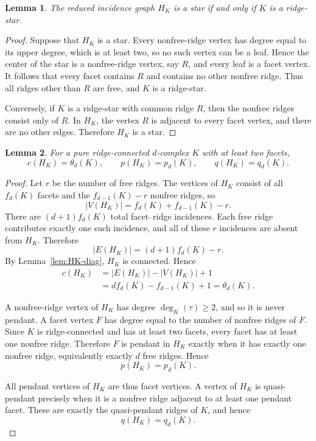 \documentclass[12pt]{article}
\newtheorem{lemma}{Lemma}
\theoremstyle{remark}
\begin{document}
\begin{lemma}\label{lem:ridge-star}
The reduced incidence graph $H_K$ is a star if and only if $K$ is a ridge-star.
\end{lemma}

\begin{proof}
Suppose that $H_K$ is a star.  Every nonfree-ridge vertex has degree equal to its upper degree, which is at least two, so no such vertex can be a leaf.  Hence the center of the star is a nonfree-ridge vertex, say $R$, and every leaf is a facet vertex.  It follows that every facet contains $R$ and contains no other nonfree ridge.  Thus all ridges other than $R$ are free, and $K$ is a ridge-star.

Conversely, if $K$ is a ridge-star with common ridge $R$, then the nonfree ridges consist only of $R$.  In $H_K$, the vertex $R$ is adjacent to every facet vertex, and there are no other edges.  Therefore $H_K$ is a star.
\end{proof}

\begin{lemma}\label{lem:parameters}
For a pure ridge-connected $d$-complex $K$ with at least two facets,
\[
c(H_K)=\theta_d(K),\qquad
p(H_K)=p_d(K),\qquad
q(H_K)=q_d(K).
\]
\end{lemma}

\begin{proof}
Let $r$ be the number of free ridges.  The vertices of $H_K$ consist of all $f_d(K)$ facets and the $f_{d-1}(K)-r$ nonfree ridges, so
\[
|V(H_K)|=f_d(K)+f_{d-1}(K)-r.
\]
There are $(d+1)f_d(K)$ total facet--ridge incidences.  Each free ridge contributes exactly one such incidence, and all of these $r$ incidences are absent from $H_K$.  Therefore
\[
|E(H_K)|=(d+1)f_d(K)-r.
\]
By Lemma~\ref{lem:HK-diag}, $H_K$ is connected.  Hence
\[
\begin{aligned}
c(H_K)
&=|E(H_K)|-|V(H_K)|+1\\
&=d f_d(K)-f_{d-1}(K)+1
=\theta_d(K).
\end{aligned}
\]

A nonfree-ridge vertex of $H_K$ has degree $\deg_K(\tau)\ge2$, and so it is never pendant.  A facet vertex $F$ has degree equal to the number of nonfree ridges of $F$.  Since $K$ is ridge-connected and has at least two facets, every facet has at least one nonfree ridge.  Therefore $F$ is pendant in $H_K$ exactly when it has exactly one nonfree ridge, equivalently exactly $d$ free ridges.  Hence
\[
p(H_K)=p_d(K).
\]

All pendant vertices of $H_K$ are thus facet vertices.  A vertex of $H_K$ is quasi-pendant precisely when it is a nonfree ridge adjacent to at least one pendant facet.  These are exactly the quasi-pendant ridges of $K$, and hence
\[
q(H_K)=q_d(K).
\]
\end{proof}
\end{document}
